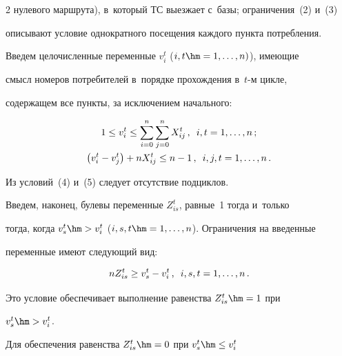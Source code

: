 \begin{multicols}{2}
нулевого маршрута), в~который ТС выезжает с~базы; ограничения~(2) и~(3)


описывают условие однократного посещения каж\-до\-го пункта потребления.





  Введем целочисленные переменные  $v_i^t$ ($i,t\hm=1,\ldots ,n)$), имеющие


смысл номеров потребителей в~порядке прохождения в~$t$-м цикле,


содержащем все пункты, за исключением начального:


  \begin{gather}


  1\leq v_i^t \leq \sum\limits_{i=0}^n \sum\limits_{j=0}^n X_{ij}^t\,, \enskip


i,t=1,\ldots, n\,;\label{e4-br}\\


  \left( v_i^t -v_j^t\right) +nX^t_{ij} \leq n-1\,,\enskip i,j,t=1,\ldots, n\,.


  \label{e5-br}


  \end{gather}





  Из условий~(4) и~(5) следует отсутствие под\-цик\-лов.





  Введем, наконец, булевы переменные $Z^t_{is}$, равные~1 тогда и~только


тогда, когда $v_s^t\hm>v_i^t$ ($i,s,t\hm=1,\ldots ,n$). Ограничения на введенные


переменные имеют следующий вид:


  \begin{equation}


  nZ_{is}^t \geq v_s^t -v_i^t\,,\enskip i,s,t=1,\ldots, n\,.


  \label{e6-br}


  \end{equation}








  Это условие обеспечивает выполнение равенства $Z_{is}^t\hm= 1$ при


$v_s^t\hm>v_i^t$.





  Для обеспечения равенства $Z_{is}^t\hm=0$ при $v_s^t\hm\leq v_i^t$



\end{multicols}
